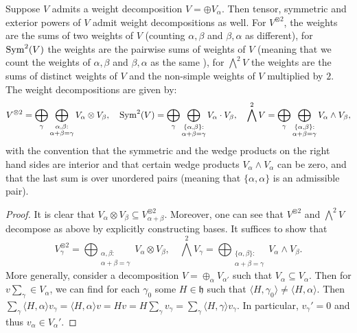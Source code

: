 \documentclass{report}
\begin{document}
\begin{lemma}
    Suppose $V$ admits a weight decomposition $V = \oplus V_\alpha$.
    Then tensor, symmetric and exterior powers of $V$ admit weight decompositions as well.
    For $V^{\otimes 2}$, the weights are the sums of two weights of $V$ (counting $\alpha, \beta$ and $\beta, \alpha$ as different), for $\operatorname{Sym}^2(V)$ the weights are the pairwise sums of weights of $V$ (meaning that we count the weights of $\alpha, \beta$ and $\beta, \alpha$ as the same ), for $\bigwedge^2 V$ the weights are the sums of distinct weights of $V$ and the non-simple weights of $V$ multiplied by $2$.
    The weight decompositions are given by:
    \[
    V^{\otimes 2} = \bigoplus_{\gamma}
    \bigoplus_{\substack{\alpha, \beta:\\ \alpha+\beta = \gamma}} V_\alpha \otimes V_\beta, \quad 
    \operatorname{Sym}^2(V) = \bigoplus_{\gamma} \bigoplus_{\substack{\{\alpha, \beta\}:\\ \alpha+\beta = \gamma}} V_\alpha \cdot V_\beta, \quad
    \bigwedge ^2 V = \bigoplus_{\gamma} \bigoplus_{\substack{\{\alpha, \beta\}:\\ \alpha+\beta = \gamma}} V_\alpha \wedge V_\beta,
    \]
    with the convention that the symmetric and the wedge products on the right hand sides are interior and that certain wedge products $V_\alpha \wedge V_\alpha$ can be zero, and that the last sum is over unordered pairs (meaning that $\{\alpha, \alpha\}$ is an admissible pair).
\end{lemma}
\begin{proof}
    It is clear that $V_\alpha \otimes V_\beta \subseteq V^{\otimes 2}_{\alpha + \beta}$.
    Moreover, one can see that $V^{\otimes 2}$ and $\bigwedge^2 V$ decompose as above by explicitly constructing bases.
    It suffices to show that 
    \[
        V^{\otimes 2}_\gamma =
        \bigoplus_{\substack{\alpha, \beta:\\ \alpha+\beta = \gamma}} V_\alpha \otimes V_\beta, \quad 
        \bigwedge ^2 V_\gamma = \bigoplus_{\substack{\{\alpha, \beta\}:\\ \alpha+\beta = \gamma}} V_\alpha \wedge V_\beta.
    \]
    More generally, consider a decomposition $V = \oplus_\alpha V_{\alpha'}$ such that $V_\alpha \subseteq V_\alpha$.
    Then for $v \sum_{\gamma} \in V_\alpha$, we can find for each $\gamma_0$ some $H \in \mathfrak h$ such that $\langle H, \gamma_0 \rangle \neq \langle H, \alpha \rangle$.
    Then $\sum_\gamma \langle H, \alpha \rangle v_\gamma = \langle H, \alpha \rangle v = H v = H \sum_\gamma v_\gamma = \sum_\gamma \langle H, \gamma \rangle v_\gamma $.
    In particular, $v_\gamma'=0$ and thus $v_\alpha \in V_\alpha'$.
\end{proof}
\end{document}
